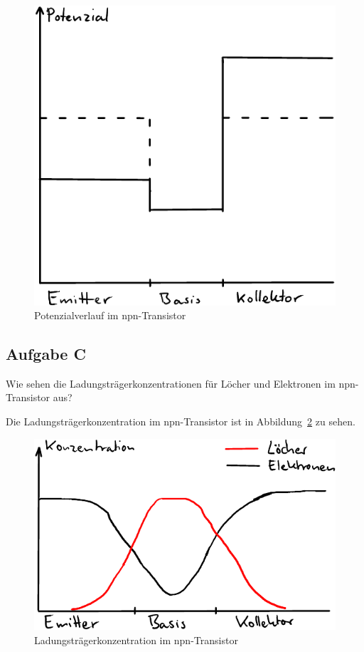 \begin{figure}
	\centering
	\includegraphics{Zeichnungen/B_Zeichnung.pdf}
	\caption{%
		Potenzialverlauf im npn-Transistor
	}
	\label{fig:B_Zeichnung}
\end{figure}

\FloatBarrier
\subsection{Aufgabe C}

\begin{problem}
	Wie sehen die Ladungsträgerkonzentrationen für Löcher und Elektronen im
	npn-Transistor aus?
\end{problem}

Die Ladungsträgerkonzentration im npn-Transistor ist in
Abbildung~\ref{fig:C_Zeichnung} zu sehen.

\begin{figure}
	\centering
	\includegraphics{Zeichnungen/C_Zeichnung.pdf}
	\caption{%
		Ladungsträgerkonzentration im npn-Transistor
	}
	\label{fig:C_Zeichnung}
\end{figure}

